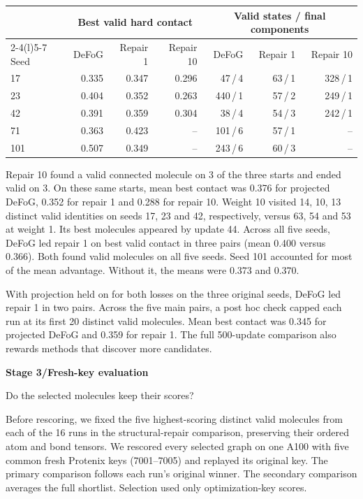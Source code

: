 \documentclass[11pt,a4paper]{article}
\newcommand{\topic}[1]{{\sffamily\bfseries\small\color{guide}#1\par}\vspace{2pt}}
\newcommand{\heading}[1]{{\raggedright\fontsize{25}{28}\selectfont #1\par}\vspace{4pt}}
\begin{document}
\begin{center}\small\sffamily
\begin{tabular*}{.97\linewidth}{@{\extracolsep{\fill}}lrrr rrr@{}}
\toprule
&\multicolumn{3}{c}{Best valid hard contact}&\multicolumn{3}{c}{Valid states / final components}\\
\cmidrule(lr){2-4}\cmidrule(l){5-7}
Seed & DeFoG & Repair 1 & Repair 10 & DeFoG & Repair 1 & Repair 10\\
\midrule
17 & 0.335 & 0.347 & 0.296 & 47\,/\,4 & 63\,/\,1 & 328\,/\,1\\
23 & 0.404 & 0.352 & 0.263 & 440\,/\,1 & 57\,/\,2 & 249\,/\,1\\
42 & 0.391 & 0.359 & 0.304 & 38\,/\,4 & 54\,/\,3 & 242\,/\,1\\
71 & 0.363 & 0.423 & -- & 101\,/\,6 & 57\,/\,1 & --\\
101 & 0.507 & 0.349 & -- & 243\,/\,6 & 60\,/\,3 & --\\
\bottomrule\end{tabular*}\end{center}
Repair 10 found a valid connected molecule on 3 of the three starts and ended valid on 3. On these same starts, mean best contact was 0.376 for projected DeFoG, 0.352 for repair 1 and 0.288 for repair 10. Weight 10 visited 14, 10, 13 distinct valid identities on seeds 17, 23 and 42, respectively, versus 63, 54 and 53 at weight 1. Its best molecules appeared by update 44. Across all five seeds, DeFoG led repair 1 on best valid contact in three pairs (mean 0.400 versus 0.366). Both found valid molecules on all five seeds. Seed 101 accounted for most of the mean advantage. Without it, the means were 0.373 and 0.370.

With projection held on for both losses on the three original seeds, DeFoG led repair 1 in two pairs. Across the five main pairs, a post hoc check capped each run at its first 20 distinct valid molecules. Mean best contact was 0.345 for projected DeFoG and 0.359 for repair 1. The full 500-update comparison also rewards methods that discover more candidates.

\newpage
\topic{Stage 3\enspace/\enspace Fresh-key evaluation}
\heading{Do the selected molecules keep their scores?}
Before rescoring, we fixed the five highest-scoring distinct valid molecules from each of the 16 runs in the structural-repair comparison, preserving their ordered atom and bond tensors. We rescored every selected graph on one A100 with five common fresh Protenix keys (7001--7005) and replayed its original key. The primary comparison follows each run's original winner. The secondary comparison averages the full shortlist. Selection used only optimization-key scores.
\end{document}
